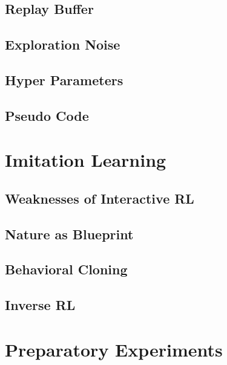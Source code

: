     \subsection{Replay Buffer}\label{subchap:buffer}
    
    \subsection{Exploration Noise}
    
    \subsection{Hyper Parameters}\label{subchap:hyperparameters}
    
    \subsection{Pseudo Code} \label{subchap:pseudo}
    
    
\newpage
\section{Imitation Learning} \label{chap:imitation}
    
        \subsection{Weaknesses of Interactive RL} \label{subchap:weak}
         
        \subsection{Nature as Blueprint}\label{subchap:nature}
        
        \subsection{Behavioral Cloning}
        
        \subsection{Inverse RL}\label{subchap:inverse}
        
\newpage
\section{Preparatory Experiments} \label{chap:synthetic}

